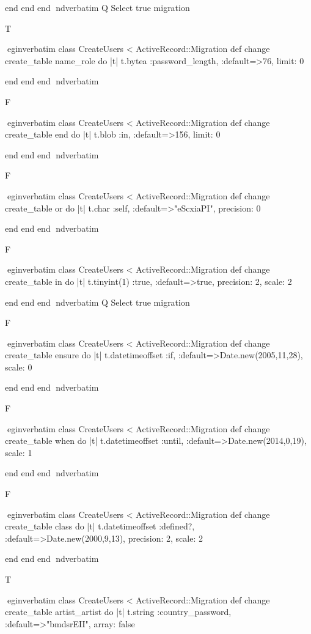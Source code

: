     end 
  end 
end
nd{verbatim}
Q
 Select true migration

T

egin{verbatim}
 class CreateUsers < ActiveRecord::Migration 
  def change 
    create_table name_role do |t| 
      t.bytea :password_length, :default=>76, limit: 0
    
    end 
  end 
end
nd{verbatim}

F

egin{verbatim}
 class CreateUsers < ActiveRecord::Migration 
  def change 
    create_table end do |t| 
      t.blob :in, :default=>156, limit: 0
    
    end 
  end 
end
nd{verbatim}

F

egin{verbatim}
 class CreateUsers < ActiveRecord::Migration 
  def change 
    create_table or do |t| 
      t.char :self, :default=>"eScxiaPI", precision: 0
    
    end 
  end 
end
nd{verbatim}

F

egin{verbatim}
 class CreateUsers < ActiveRecord::Migration 
  def change 
    create_table in do |t| 
      t.tinyint(1) :true, :default=>true, precision: 2, scale: 2
    
    end 
  end 
end
nd{verbatim}
Q
 Select true migration

F

egin{verbatim}
 class CreateUsers < ActiveRecord::Migration 
  def change 
    create_table ensure do |t| 
      t.datetimeoffset :if, :default=>Date.new(2005,11,28), scale: 0
    
    end 
  end 
end
nd{verbatim}

F

egin{verbatim}
 class CreateUsers < ActiveRecord::Migration 
  def change 
    create_table when do |t| 
      t.datetimeoffset :until, :default=>Date.new(2014,0,19), scale: 1
    
    end 
  end 
end
nd{verbatim}

F

egin{verbatim}
 class CreateUsers < ActiveRecord::Migration 
  def change 
    create_table class do |t| 
      t.datetimeoffset :defined?, :default=>Date.new(2000,9,13), precision: 2, scale: 2
    
    end 
  end 
end
nd{verbatim}

T

egin{verbatim}
 class CreateUsers < ActiveRecord::Migration 
  def change 
    create_table artist_artist do |t| 
      t.string :country_password, :default=>"bmdsrEII", array: false
    
